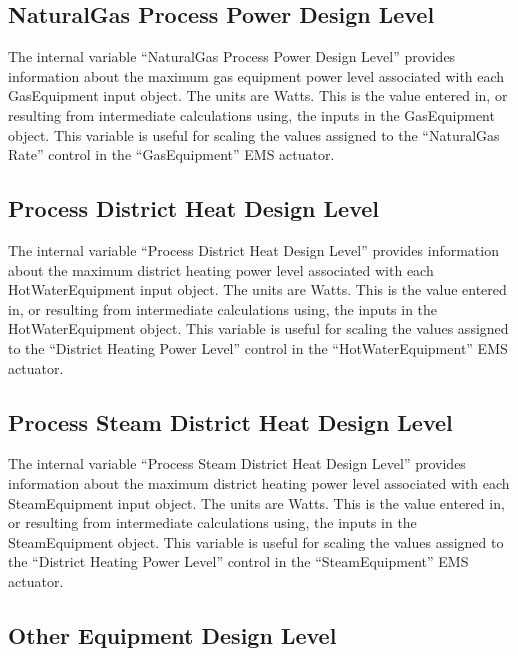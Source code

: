 \subsection{NaturalGas Process Power Design Level}\label{gas-process-power-design-level}

The internal variable ``NaturalGas Process Power Design Level'' provides information about the maximum gas equipment power level associated with each GasEquipment input object. The units are Watts. This is the value entered in, or resulting from intermediate calculations using, the inputs in the GasEquipment object. This variable is useful for scaling the values assigned to the ``NaturalGas Rate'' control in the ``GasEquipment'' EMS actuator.

\subsection{Process District Heat Design Level}\label{process-district-heat-design-level}

The internal variable ``Process District Heat Design Level'' provides information about the maximum district heating power level associated with each HotWaterEquipment input object. The units are Watts. This is the value entered in, or resulting from intermediate calculations using, the inputs in the HotWaterEquipment object. This variable is useful for scaling the values assigned to the ``District Heating Power Level'' control in the ``HotWaterEquipment'' EMS actuator.

\subsection{Process Steam District Heat Design Level}\label{process-steam-district-heat-design-level}

The internal variable ``Process Steam District Heat Design Level'' provides information about the maximum district heating power level associated with each SteamEquipment input object. The units are Watts. This is the value entered in, or resulting from intermediate calculations using, the inputs in the SteamEquipment object. This variable is useful for scaling the values assigned to the ``District Heating Power Level'' control in the ``SteamEquipment'' EMS actuator.

\subsection{Other Equipment Design Level}\label{other-equipment-design-level}

